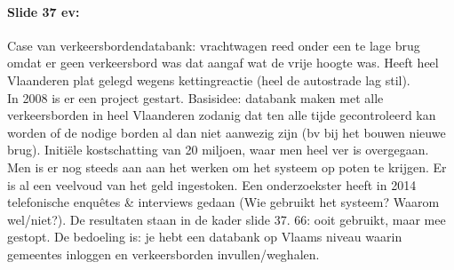 \documentclass[10pt,a4paper]{report}
\begin{document}
\paragraph{Slide 37 ev:}Case van verkeersbordendatabank: vrachtwagen reed onder een te lage brug omdat er geen verkeersbord was dat aangaf wat de vrije hoogte was. Heeft heel Vlaanderen plat gelegd wegens kettingreactie (heel de autostrade lag stil).\\
In 2008 is er een project gestart. Basisidee: databank maken met alle verkeersborden in heel Vlaanderen zodanig dat ten alle tijde gecontroleerd kan worden of de nodige borden al dan niet aanwezig zijn (bv bij het bouwen nieuwe brug). Initiële kostschatting van 20 miljoen, waar men heel ver is overgegaan. Men is er nog steeds aan aan het werken om het systeem op poten te krijgen. Er is al een veelvoud van het geld ingestoken. Een onderzoekster heeft in 2014 telefonische enquêtes \& interviews gedaan (Wie gebruikt het systeem? Waarom wel/niet?). De resultaten staan in de kader slide 37. 66: ooit gebruikt, maar mee gestopt. De bedoeling is: je hebt een databank op Vlaams niveau waarin gemeentes inloggen en verkeersborden invullen/weghalen.
\end{document}
